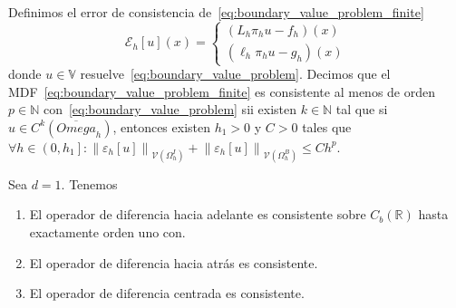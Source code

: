 \begin{definition}[Consistencia]
    Definimos el error de consistencia
    de~\eqref{eq:boundary_value_problem_finite}
    \begin{equation*}
        \mathcal{E}_{h}
        \left[u\right]
        \left(x\right)=
        \begin{cases}
            \left(L_{h}\pi_{h}u-f_{h}\right)\left(x\right) \\
            \left(\ell_{h}\pi_{h}u-g_{h}\right)\left(x\right)
        \end{cases}
    \end{equation*}
    donde $u\in\mathbb{V}$
    resuelve~\eqref{eq:boundary_value_problem}.
    Decimos que el MDF~\eqref{eq:boundary_value_problem_finite} es
    consistente al menos de orden $p\in\mathbb{N}$
    con~\eqref{eq:boundary_value_problem} sii existen
    $k\in\mathbb{N}$ tal que si
    \begin{math}
        u\in C^{k}\left(\overline{Omega}_{h}\right)
    \end{math},
    entonces existen $h_{1}>0$ y $C>0$ tales que
    \begin{math}
        \forall h\in\left(0,h_{1}\right]:
        {
        \left\|\mathcal{\varepsilon}_{h}\left[u\right]\right\|
        }_{\mathcal{V}\left(\Omega^{I}_{h}\right)}+
        {
        \left\|\mathcal{\varepsilon}_{h}\left[u\right]\right\|
        }_{\mathcal{V}\left(\Omega^{B}_{h}\right)}\leq
        C h^{p}
    \end{math}.
\end{definition}

\begin{proposition}[Consistencia]
    Sea $d=1$. Tenemos
    \begin{enumerate}
        \item

              El operador de diferencia hacia adelante es consistente
              sobre
              \begin{math}
                  C_{b}\left(\mathbb{R}\right)
              \end{math}
              hasta exactamente orden uno con.

        \item

              El operador de diferencia hacia atrás es consistente.

        \item

              El operador de diferencia centrada es consistente.
    \end{enumerate}
\end{proposition}

